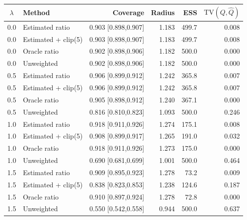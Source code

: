 \begin{tabular}{clrrrr}
\toprule
$\lambda$ & Method & Coverage & Radius & ESS & $\mathrm{TV}(Q,\widehat Q)$ \\
\midrule
0.0 & Estimated ratio & 0.903 [0.898,0.907] & 1.183 & 499.7 & 0.008 \\
0.0 & Estimated + clip(5) & 0.903 [0.898,0.907] & 1.183 & 499.7 & 0.008 \\
0.0 & Oracle ratio & 0.902 [0.898,0.906] & 1.182 & 500.0 & 0.000 \\
0.0 & Unweighted & 0.902 [0.898,0.906] & 1.182 & 500.0 & 0.000 \\
\midrule
0.5 & Estimated ratio & 0.906 [0.899,0.912] & 1.242 & 365.8 & 0.007 \\
0.5 & Estimated + clip(5) & 0.906 [0.899,0.912] & 1.242 & 365.8 & 0.007 \\
0.5 & Oracle ratio & 0.905 [0.898,0.912] & 1.240 & 367.1 & 0.000 \\
0.5 & Unweighted & 0.816 [0.810,0.823] & 1.093 & 500.0 & 0.246 \\
\midrule
1.0 & Estimated ratio & 0.918 [0.911,0.926] & 1.274 & 175.1 & 0.008 \\
1.0 & Estimated + clip(5) & 0.908 [0.899,0.917] & 1.265 & 191.0 & 0.032 \\
1.0 & Oracle ratio & 0.918 [0.911,0.926] & 1.273 & 175.0 & 0.000 \\
1.0 & Unweighted & 0.690 [0.681,0.699] & 1.001 & 500.0 & 0.464 \\
\midrule
1.5 & Estimated ratio & 0.909 [0.895,0.923] & 1.278 & 73.2 & 0.009 \\
1.5 & Estimated + clip(5) & 0.838 [0.823,0.853] & 1.238 & 124.6 & 0.187 \\
1.5 & Oracle ratio & 0.910 [0.897,0.924] & 1.278 & 72.8 & 0.000 \\
1.5 & Unweighted & 0.550 [0.542,0.558] & 0.944 & 500.0 & 0.637 \\
\bottomrule
\end{tabular}
